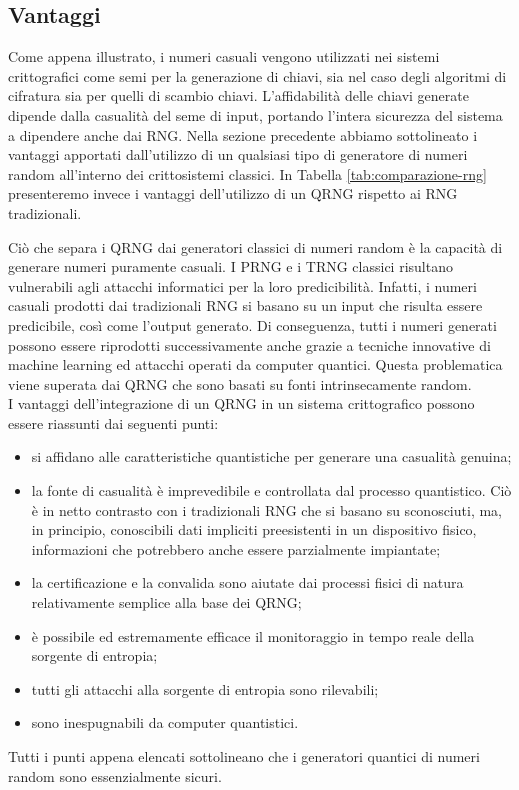 \subsection{Vantaggi}
Come appena illustrato, i numeri casuali vengono utilizzati nei sistemi crittografici come semi per la generazione di chiavi, sia nel caso degli algoritmi di cifratura sia per quelli di scambio chiavi. L'affidabilità delle chiavi generate dipende dalla casualità del seme di input, portando l'intera sicurezza del sistema a dipendere anche dai RNG. Nella sezione precedente abbiamo sottolineato i vantaggi apportati dall'utilizzo di un qualsiasi tipo di generatore di numeri random all'interno dei crittosistemi classici. In Tabella \ref{tab:comparazione-rng} presenteremo invece i vantaggi dell'utilizzo di un QRNG rispetto ai RNG tradizionali. 

Ciò che separa i QRNG dai generatori classici di numeri random è la capacità di generare numeri puramente casuali. I PRNG e i TRNG classici risultano vulnerabili agli attacchi informatici per la loro predicibilità. Infatti, i numeri casuali prodotti dai tradizionali RNG si basano su un input che risulta essere predicibile, così come l'output generato. Di conseguenza, tutti i numeri generati possono essere riprodotti successivamente anche grazie a tecniche innovative di machine learning ed attacchi operati da computer quantici. Questa problematica viene superata dai QRNG che sono basati su fonti intrinsecamente random. \\
I vantaggi dell'integrazione di un QRNG in un sistema crittografico possono essere riassunti dai seguenti punti: 
\begin{itemize}
    \item si affidano alle caratteristiche quantistiche per generare una casualità genuina;
    \item la fonte di casualità è imprevedibile e controllata dal processo quantistico. Ciò è in netto contrasto con i tradizionali RNG che si basano su sconosciuti, ma, in principio, conoscibili dati impliciti preesistenti in un dispositivo fisico, informazioni che potrebbero anche essere parzialmente impiantate;
    \item la certificazione e la convalida sono aiutate dai processi fisici di natura relativamente semplice alla base dei QRNG;
    \item è possibile ed estremamente efficace il monitoraggio in tempo reale della sorgente di entropia;
    \item tutti gli attacchi alla sorgente di entropia sono rilevabili;
    \item sono inespugnabili da computer quantistici.
\end{itemize}
Tutti i punti appena elencati sottolineano che i generatori quantici di numeri random sono essenzialmente sicuri. 

